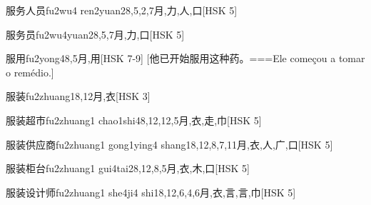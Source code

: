 \begin{EntryWithPhonetic}{服务人员}{fu2wu4 ren2yuan2}{8,5,2,7}{⽉,⼒,⼈,⼝}[HSK 5]
\end{EntryWithPhonetic}

\begin{EntryWithPhonetic}{服务员}{fu2wu4yuan2}{8,5,7}{⽉,⼒,⼝}[HSK 5]
\end{EntryWithPhonetic}

\begin{EntryWithPhonetic}{服用}{fu2yong4}{8,5}{⽉,⽤}[HSK 7-9]
  [他已开始服用这种药。===Ele começou a tomar o remédio.]
\end{EntryWithPhonetic}

\begin{EntryWithPhonetic}{服装}{fu2zhuang1}{8,12}{⽉,⾐}[HSK 3]
\end{EntryWithPhonetic}

\begin{EntryWithPhonetic}{服装超市}{fu2zhuang1 chao1shi4}{8,12,12,5}{⽉,⾐,⾛,⼱}[HSK 5]
\end{EntryWithPhonetic}

\begin{EntryWithPhonetic}{服装供应商}{fu2zhuang1 gong1ying4 shang1}{8,12,8,7,11}{⽉,⾐,⼈,⼴,⼝}[HSK 5]
\end{EntryWithPhonetic}

\begin{EntryWithPhonetic}{服装柜台}{fu2zhuang1 gui4tai2}{8,12,8,5}{⽉,⾐,⽊,⼝}[HSK 5]
\end{EntryWithPhonetic}

\begin{EntryWithPhonetic}{服装设计师}{fu2zhuang1 she4ji4 shi1}{8,12,6,4,6}{⽉,⾐,⾔,⾔,⼱}[HSK 5]
\end{EntryWithPhonetic}

